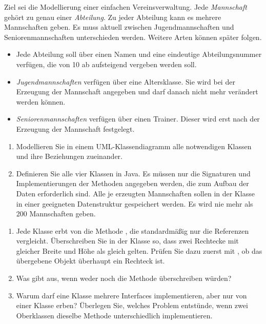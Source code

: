 Ziel sei die Modellierung einer einfachen Vereinsverwaltung. Jede \emph{Mannschaft} gehört zu genau einer \emph{Abteilung}. Zu jeder Abteilung kann es mehrere Mannschaften geben. Es muss aktuell zwischen Jugendmannschaften und Seniorenmannschaften unterschieden werden. Weitere Arten können später folgen.
\begin{itemize}[itemsep=0.1em]
\item Jede Abteilung soll über einen Namen und eine eindeutige Abteilungsnummer verfügen, die von 10 ab aufsteigend vergeben werden soll.
\item \emph{Jugendmannschaften} verfügen über eine Altersklasse. Sie wird bei der Erzeugung der Mannschaft angegeben und darf danach nicht mehr verändert werden können.
\item \emph{Seniorenmannschaften} verfügen über einen Trainer. Dieser wird erst nach der Erzeugung der Mannschaft festgelegt.
\end{itemize}
\begin{enumerate}[label=\alph*)]
\item Modellieren Sie in einem UML-Klassendiagramm alle notwendigen Klassen und ihre Beziehungen zueinander.
\item Definieren Sie alle vier Klassen in Java. Es müssen nur die Signaturen und Implementierungen der Methoden angegeben werden, die zum Aufbau der Daten erforderlich sind. Alle je erzeugten Mannschaften sollen in der Klasse  in einer geeigneten Datenstruktur gespeichert werden. Es wird nie mehr als 200 Mannschaften geben.
\end{enumerate}

\begin{enumerate}[label=\alph*)]
\item Jede Klasse erbt von  die Methode , die standardmäßig nur die Referenzen vergleicht. Überschreiben Sie  in der Klasse  so, dass zwei Rechtecke mit gleicher Breite und Höhe als gleich gelten. Prüfen Sie dazu zuerst mit , ob das übergebene Objekt überhaupt ein Rechteck ist.
\item Was gibt  aus, wenn weder  noch  die Methode  überschreiben würden?
\item Warum darf eine Klasse mehrere Interfaces implementieren, aber nur von einer Klasse erben? Überlegen Sie, welches Problem entstünde, wenn zwei Oberklassen dieselbe Methode unterschiedlich implementieren.
\end{enumerate}

